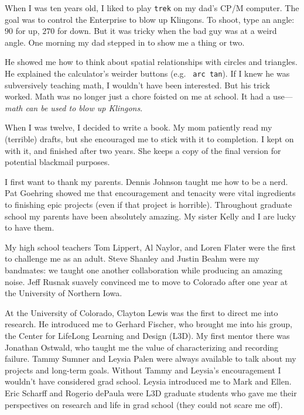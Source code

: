 When I was ten years old, I liked to play {\tt trek} on my dad's CP/M
computer. The goal was to control the Enterprise to blow up
Klingons. To shoot, type an angle: $90$ for up, $270$ for down. But it
was tricky when the bad guy was at a weird angle. One morning my dad
stepped in to show me a thing or two.

He showed me how to think about spatial relationships with circles and
triangles. He explained the calculator's weirder buttons (e.g. {\tt
  arc tan}). If I knew he was subversively teaching math, I wouldn't
have been interested. But his trick worked. Math was no longer just a
chore foisted on me at school. It had a use---\textit{math can be used
  to blow up Klingons}.

When I was twelve, I decided to write a book. My mom patiently read my
(terrible) drafts, but she encouraged me to stick with it to
completion. I kept on with it, and finished after two years. She keeps
a copy of the final version for potential blackmail purposes.

I first want to thank my parents. Dennis Johnson taught me how to be a
nerd. Pat Goehring showed me that encouragement and tenacity were
vital ingredients to finishing epic projects (even if that project is
horrible). Throughout graduate school my parents have been absolutely
amazing. My sister Kelly and I are lucky to have them. 

My high school teachers Tom Lippert, Al Naylor, and Loren Flater were
the first to challenge me as an adult. Steve Shanley and Justin Beahm
were my bandmates: we taught one another collaboration while producing
an amazing noise. Jeff Rusnak suavely convinced me to move to Colorado
after one year at the University of Northern Iowa.

At the University of Colorado, Clayton Lewis was the first to direct
me into research. He introduced me to Gerhard Fischer, who brought me
into his group, the Center for LifeLong Learning and Design (L3D). My
first mentor there was Jonathan Ostwald, who taught me the value of
characterizing and recording failure. Tammy Sumner and Leysia Palen
were always available to talk about my projects and long-term
goals. Without Tammy and Leysia's encouragement I wouldn't have
considered grad school. Leysia introduced me to Mark and Ellen. Eric
Scharff and Rogerio dePaula were L3D graduate students who gave me
their perspectives on research and life in grad school (they could not
scare me off).

\newpage

